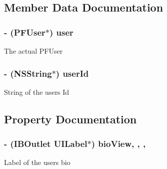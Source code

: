 \subsection{Member Data Documentation}
\hypertarget{category_e_s_profile_view_07_08_a132b6835d20fdea7784075334099adc9}{}
\subsubsection[{user}]{\setlength{\rightskip}{0pt plus 5cm}-\/ (P\+F\+User$\ast$) user\hspace{0.3cm}{\ttfamily [protected]}}\label{category_e_s_profile_view_07_08_a132b6835d20fdea7784075334099adc9}
The actual P\+F\+User \hypertarget{category_e_s_profile_view_07_08_a2761cfdb3641da321f8bbdba1dbf562f}{}
\subsubsection[{user\+Id}]{\setlength{\rightskip}{0pt plus 5cm}-\/ (N\+S\+String$\ast$) user\+Id\hspace{0.3cm}{\ttfamily [protected]}}\label{category_e_s_profile_view_07_08_a2761cfdb3641da321f8bbdba1dbf562f}
String of the user\textquotesingle{}s Id 

\subsection{Property Documentation}
\hypertarget{category_e_s_profile_view_07_08_a39b043600458d3e9171a01232646e4b1}{}
\subsubsection[{bio\+View}]{\setlength{\rightskip}{0pt plus 5cm}-\/ (I\+B\+Outlet U\+I\+Label$\ast$) bio\+View\hspace{0.3cm}{\ttfamily [read]}, {\ttfamily [write]}, {\ttfamily [nonatomic]}, {\ttfamily [strong]}}\label{category_e_s_profile_view_07_08_a39b043600458d3e9171a01232646e4b1}
Label of the user\textquotesingle{}s bio \hypertarget{category_e_s_profile_view_07_08_ac1c297b924aa4ac3c198eced3b75208b}{}
